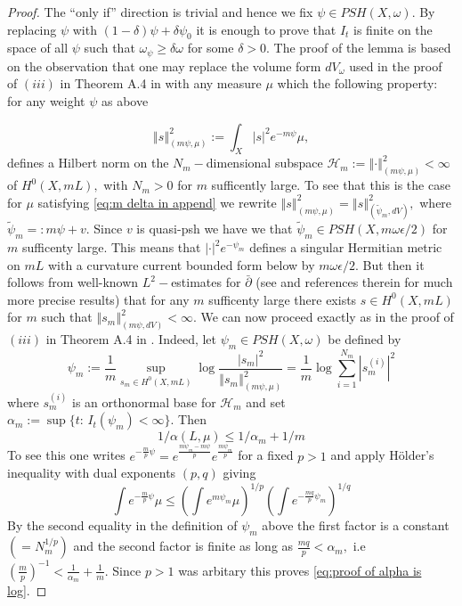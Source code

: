 \documentclass[11pt,oneside,english]{amsart}
\numberwithin{equation}{section}
\numberwithin{figure}{section}
\theoremstyle{plain}
\theoremstyle{plain}
\theoremstyle{plain}
\theoremstyle{plain}
\theoremstyle{remark}
\theoremstyle{definition}
\begin{document}
\begin{proof}
The ``only if'' direction is trivial and hence we fix $\psi\in PSH(X,\omega).$
By replacing $\psi$ with $(1-\delta)\psi+\delta\psi_{0}$ it is enough
to prove that $I_{t}$ is finite on the space of all $\psi$ such
that $\omega_{\psi}\geq\delta\omega$ for some $\delta>0.$ The proof
of the lemma is based on the observation that one may replace the
volume form $dV_{\omega}$ used in the proof of $(iii)$ in Theorem
A.4 in \cite{dem2} with any measure $\mu$ which the following property:
for any weight $\psi$ as above 

\begin{equation}
\left\Vert s\right\Vert _{(m\psi,\mu)}^{2}:=\int_{X}|s|^{2}e^{-m\psi}\mu,\label{eq:hilbert space}
\end{equation}
 defines a Hilbert norm on the $N_{m}-$dimensional subspace \emph{$\mathcal{H}_{m}:=\left\Vert \cdot\right\Vert _{(m\psi,\mu)}^{2}<\infty$}
of $H^{0}(X,mL),$ with $N_{m}>0$ for $m$ sufficently large. To
see that this is the case for $\mu$ satisfying \ref{eq:m delta in append}
we rewrite $\left\Vert s\right\Vert _{(m\psi,\mu)}^{2}=\left\Vert s\right\Vert _{(\tilde{\psi}_{m},dV)}^{2},$
where $\tilde{\psi}_{m}=:m\psi+v.$ Since $v$ is quasi-psh we have
we that $\tilde{\psi}_{m}\in PSH(X,m\omega\epsilon/2)$ for $m$ sufficenty
large. This means that $|\cdot|^{2}e^{-\psi_{m}}$ defines a singular
Hermitian metric on $mL$ with a curvature current bounded form below
by $m\omega\epsilon/2.$ But then it follows from well-known $L^{2}-$estimates
for $\bar{\partial}$ (see \cite{dem2} and references therein for
much more precise results) that for any $m$ sufficenty large there
exists $s\in H^{0}(X,mL)$ for $m$ such that $\left\Vert s_{m}\right\Vert _{(m\psi,dV)}^{2}<\infty.$
We can now proceed exactly as in the proof of $(iii)$ in Theorem
A.4 in \cite{dem2}. Indeed, let $\psi_{m}\in PSH(X,\omega)$ be defined
by 
\[
\psi_{m}:=\frac{1}{m}\sup_{s_{m}\in H^{0}(X,mL)}\log\frac{|s_{m}|^{2}}{\left\Vert s_{m}\right\Vert _{(m\psi,\mu)}^{2}}=\frac{1}{m}\log\sum_{i=1}^{N_{m}}|s_{m}^{(i)}|^{2}
\]
 where $s_{m}^{(i)}$ is an orthonormal base for $\mathcal{H}_{m}$
and set $\alpha_{m}:=\sup\{t:\, I_{t}(\psi_{m})<\infty\}.$ Then 
\begin{equation}
1/\alpha(L,\mu)\leq1/\alpha_{m}+1/m\label{eq:proof of alpha is log}
\end{equation}
 To see this one writes $e^{-\frac{m}{p}\psi}=e^{\frac{m\psi_{m}-m\psi}{p}}e^{\frac{m\psi_{m}}{p}}$
for a fixed $p>1$ and apply Hölder's inequality with dual exponents
$(p,q)$ giving 
\[
\int e^{-\frac{m}{p}\psi}\mu\leq(\int e^{m\psi_{m}}\mu)^{1/p}(\int e^{-\frac{mq}{p}\psi_{m}})^{1/q}
\]
 By the second equality in the definition of $\psi_{m}$ above the
first factor is a constant $(=N_{m}^{1/p})$ and the second factor
is finite as long as $\frac{mq}{p}<\alpha_{m},$ i.e $(\frac{m}{p})^{-1}<\frac{1}{\alpha_{m}}+\frac{1}{m}.$
Since $p>1$ was arbitary this proves \ref{eq:proof of alpha is log}.


\end{proof}
\end{document}
